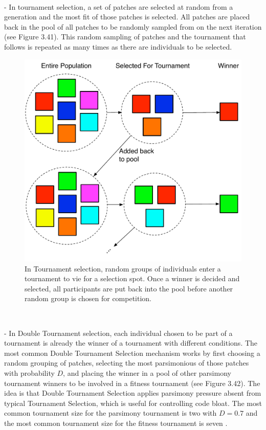 \documentclass[a4paper,12pt]{report} 	%
\numberwithin{figure}{chapter}
\numberwithin{table}{chapter}
\numberwithin{equation}{chapter}
\begin{document}
\begin{flushleft}
\begin{description}
\begin{figure}[h!]
\begin{center}
\end{center}
\end{figure}
\\
\item [Tournament Selection] - In tournament selection, a set of patches are selected at random from a generation and the most fit of those patches is selected. All patches are placed back in the pool of all patches to be randomly sampled from on the next iteration (see Figure 3.41). This random sampling of patches and the tournament that follows is repeated as many times as there are individuals to be selected.
\begin{figure}[h!]
\begin{center}
\includegraphics[scale = 0.6]{TournamentSelection}
\caption[Tournament Selection]{In Tournament selection, random groups of individuals enter a tournament to vie for a selection spot. Once a winner is decided and selected, all participants are put back into the pool before another random group is chosen for competition.}
\end{center}
\end{figure}
\\
\item 
\item [Double Tournament Selection] - In Double Tournament selection, each individual chosen to be part of a tournament is already the winner of a tournament with different conditions. The most common Double Tournament Selection mechanism works by first choosing a random grouping of patches, selecting the most parsimonious of those patches with probability $D$, and placing the winner in a pool of other parsimony tournament winners to be involved in a fitness tournament (see Figure 3.42). The idea is that Double Tournament Selection applies parsimony pressure absent from typical Tournament Selection, which is useful for controlling code bloat. The most common tournament size for the parsimony tournament is two with $D = 0.7$ and the most common tournament size for the fitness tournament is seven \cite[p. 21]{luke2006comparison}.

\end{description}
\end{flushleft}
\end{document}
